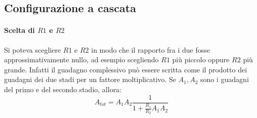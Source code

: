 \documentclass[10pt,a4paper]{article}
\begin{document}
\subsection{Configurazione a cascata}

\paragraph{Scelta di $R1$ e $R2$} Si poteva scegliere $R1$ e $R2$ in modo che il rapporto fra i due fosse approssimativamente nullo, ad esempio scegliendo $R1$ più piccolo oppure $R2$ più grande.
Infatti il guadagno complessivo può essere scritta come il prodotto dei guadagni dei due stadi per un fattore moltiplicativo. Se $A_1, A_2$ sono i guadagni del primo e del secondo stadio, allora:
\begin{equation*}
A_{tot} = A_1 A_2 \frac{1}{1 + \frac{R_1}{R_2} A_1 A_2}
\end{equation*}


\end{document}
